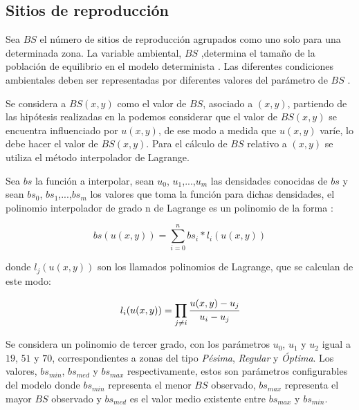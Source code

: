 \subsection{Sitios de reproducción}
\label{subsec:cap4-sitios de reproduccion}
Sea $BS$ el número de sitios de reproducción agrupados como uno solo para una determinada zona. La
variable ambiental, $BS$ ,determina el tamaño de la población de equilibrio en el modelo
determinista \cite{otero2006stochastic, otero2008stochastic}. Las diferentes condiciones
ambientales deben ser representadas por diferentes valores del parámetro de $BS$
\cite{otero2008stochastic}.

Se considera a $BS(x,y)$ como el valor de $BS$, asociado a $(x,y)$, partiendo de las hipótesis
realizadas en la  podemos considerar que el valor de $BS(x,y)$ se
encuentra influenciado por $u(x,y)$, de ese modo a medida que $u(x,y)$ varíe, lo debe hacer el
valor de $BS(x,y)$. Para el cálculo de $BS$ relativo a $(x,y)$ se utiliza el método interpolador
de Lagrange.

Sea $bs$ la función a interpolar, sean $u_0$, $u_1$,...,$u_m$ las densidades conocidas de $bs$ y
sean $bs_0$, $bs_1$,...,$bs_m$ los valores que toma la función para dichas densidades, el polinomio interpolador de grado n de Lagrange es un polinomio de la forma :

\begin{equation}
\label{eq:sitios-reproduccion-x-y}
    bs(u(x,y)) = \sum_{i=0}^{n} bs_{i} * l_{i}(u(x,y))
\end{equation}

donde $l_j(u(x,y))$ son los llamados polinomios de Lagrange, que se calculan de este modo:

\begin{equation}
\label{eq:sitios-reproduccion-x-y}
    l_{i}(u(x,y)) = \prod_{j \neq i} \cfrac{u(x,y) - u_{j}}{u_{i} - u_{j}}
\end{equation}

Se considera un polinomio de tercer grado, con los parámetros $u_0$, $u_1$ y $u_2$ igual a $19$,
$51$ y $70$, correspondientes a zonas del tipo \textit{Pésima}, \textit{Regular} y \textit{Óptima}.
Los valores, $bs_{min}$, $bs_{med}$ y $bs_{max}$ respectivamente, estos son parámetros
configurables del modelo donde $bs_{min}$ representa el menor $BS$ observado, $bs_{max}$
representa el mayor $BS$ observado y  $bs_{med}$ es el valor medio existente entre $bs_{max}$ y
$bs_{min}$.
